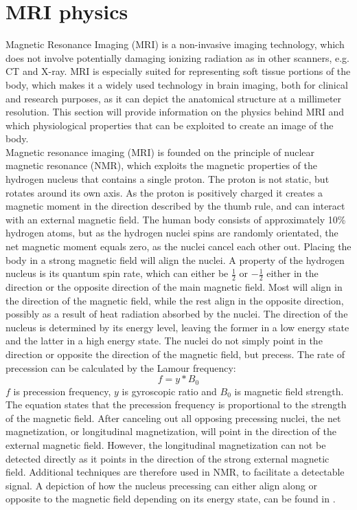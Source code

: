 \section{MRI physics} \label{sec:physics}

Magnetic Resonance Imaging (MRI) is a non-invasive imaging technology, which does not involve potentially damaging ionizing radiation as in other scanners, e.g. CT and X-ray. MRI is especially suited for representing soft tissue portions of the body, which makes it a widely used technology in brain imaging, both for clinical and research purposes, as it can depict the anatomical structure at a millimeter resolution. This section will provide information on the physics behind MRI and which physiological properties that can be exploited to create an image of the body.\\ 
Magnetic resonance imaging (MRI) is founded on the principle of nuclear magnetic resonance (NMR), which exploits the magnetic properties of the hydrogen nucleus that contains a single proton. The proton is not static, but rotates around its own axis. As the proton is positively charged it creates a magnetic moment in the direction described by the thumb rule, and can interact with an external magnetic field. The human body consists of approximately 10\% hydrogen atoms, but as the hydrogen nuclei spins are randomly orientated, the net magnetic moment equals zero, as the nuclei cancel each other out. Placing the body in a strong magnetic field will align the nuclei. A property of the hydrogen nucleus is its quantum spin rate, which can either be $ \frac{1}{2}$ or $- \frac{1}{2}$ either in the direction or the opposite direction of the main magnetic field. Most will align in the direction of the magnetic field, while the rest align in the opposite direction, possibly as a result of heat radiation absorbed by the nuclei. The direction of the nucleus is determined by its energy level, leaving the former in a low energy state and the latter in a high energy state. The nuclei do not simply point in the direction or opposite the direction of the magnetic field, but precess. \cite{Bharath2008} The rate of precession can be calculated by the Lamour frequency:
\begin{equation} \label{eq:lamour}
f=y*B_0
\end{equation} 
$f$ is precession frequency, $y$ is gyroscopic ratio and $B_0$ is magnetic field strength. The equation states that the precession frequency is proportional to the strength of the magnetic field. After canceling out all opposing precessing nuclei, the net magnetization, or longitudinal magnetization, will point in the direction of the external magnetic field. However, the longitudinal magnetization can not be detected directly as it points in the direction of the strong external magnetic field. Additional techniques are therefore used in NMR, to facilitate a detectable signal. \cite{Bharath2008} A depiction of how the nucleus precessing can either align along or opposite to the magnetic field depending on its energy state, can be found in .  \\

